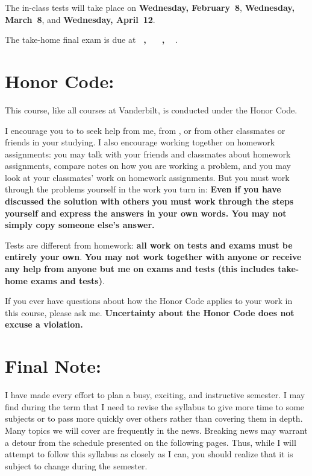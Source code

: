 \documentclass[11pt]{jgsyllabus}\usepackage[]{graphicx}\usepackage[]{xcolor}
\begin{document}
The in-class tests will take place on
\textbf{Wednesday, February~8},
\textbf{Wednesday, March~8},
and
\textbf{Wednesday, April~12}.

The take-home final exam is due at
\ifAltFinal
\textbf{\AltFinalExamEndTime~\AltFinalExamDay, \AltFinalExamMonth~\AltFinalExamDate}%
\else
\textbf{\FinalExamEndTime~\FinalExamDay, \FinalExamMonth~\FinalExamDate}%
\fi
.

\section{Honor Code:}
This course, like all courses at Vanderbilt, is conducted under the Honor Code.

I encourage you to to seek help from me, from \TaTitle,
or from other classmates or friends in your studying. I also encourage working together
on homework assignments: you may talk with your friends and classmates about
homework assignments, compare notes on how you are working a problem, and you
may look at your classmates' work on homework assignments. %
But you must work through the problems yourself
in the work you turn in: \textbf{Even if you have discussed the solution with others you must
work through the steps yourself and express the answers in your own words. You may not
simply copy someone else's answer.} %

Tests are different from homework: \textbf{%
all work on tests and exams must be entirely your own}.
\textbf{You may not work together with anyone or receive any help from anyone but me
on exams and tests (this includes take-home exams and tests)}.

If you ever
have questions about how the Honor Code applies to your work
in this course, please ask me.
\textbf{Uncertainty about the Honor Code does not excuse a violation.}

\section{Final Note:}

I have made every effort to plan a busy, exciting, and instructive semester.
I may find during the term that I need to revise the syllabus to give more time
to some subjects or to pass more quickly over others rather than covering them
in depth. Many topics we will cover are frequently in the news. Breaking news
may warrant a detour from the schedule presented on the following pages.
Thus, while I will attempt to follow this syllabus as closely as I can,
you should realize that it is subject to change during the semester.
%
%
\iftrue
\end{document}
